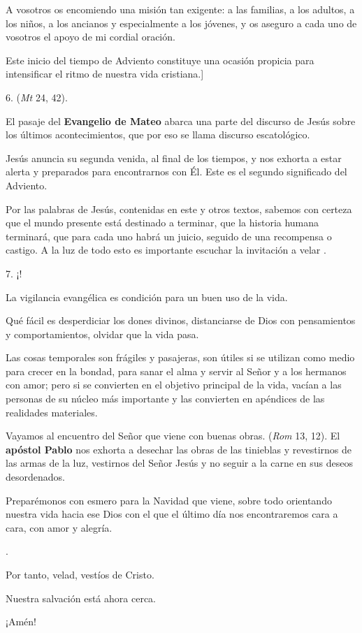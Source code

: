 \begin{body}
	A vosotros os encomiendo una misión tan exigente: a las familias, a los adultos, a los niños, a los ancianos y especialmente a los jóvenes, y os aseguro a cada uno de vosotros el apoyo de mi cordial oración. 
	
	Este inicio del tiempo de Adviento constituye una ocasión propicia para intensificar el ritmo de nuestra vida cristiana.{]}
	
	6.  (\emph{Mt} 24, 42). 
	
	El pasaje del \textbf{Evangelio de Mateo} abarca una parte del discurso de Jesús sobre los últimos acontecimientos, que por eso se llama discurso escatológico. 
	
	Jesús anuncia su segunda venida, al final de los tiempos, y nos exhorta a estar alerta y preparados para encontrarnos con Él. Este es el segundo significado del Adviento. 
	
	Por las palabras de Jesús, contenidas en este y otros textos, sabemos con certeza que el mundo presente está destinado a terminar, que la historia humana terminará, que para cada uno habrá un juicio, seguido de una recompensa o castigo. A la luz de todo esto es importante escuchar la invitación a velar . 
	
	7. ¡! 
	
	La vigilancia evangélica es condición para un buen uso de la vida. 
	
	Qué fácil es desperdiciar los dones divinos, distanciarse de Dios con pensamientos y comportamientos, olvidar que la vida pasa. 
	
	Las cosas temporales son frágiles y pasajeras, son útiles si se utilizan como medio para crecer en la bondad, para sanar el alma y servir al Señor y a los hermanos con amor; pero si se convierten en el objetivo principal de la vida, vacían a las personas de su núcleo más importante y las convierten en apéndices de las realidades materiales. 
	
	Vayamos al encuentro del Señor que viene con buenas obras.  (\emph{Rom} 13, 12). El \textbf{apóstol Pablo} nos exhorta a desechar las obras de las tinieblas y revestirnos de las armas de la luz, vestirnos del Señor Jesús y no seguir a la carne en sus deseos desordenados. 
	
	Preparémonos con esmero para la Navidad que viene, sobre todo orientando nuestra vida hacia ese Dios con el que el último día nos encontraremos cara a cara, con amor y alegría. 
	
	. 
	
	Por tanto, velad, vestíos de Cristo. 
	
	Nuestra salvación está ahora cerca. 
	
	¡Amén!
\end{body}

